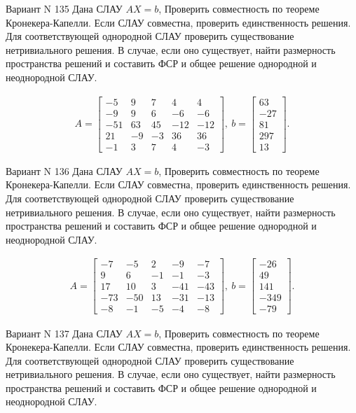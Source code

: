 \documentclass[11pt]{report}
\begin{document}
Вариант N 135
Дана СЛАУ $AX = b$,
Проверить совместность по теореме Кронекера-Капелли. Если СЛАУ совместна, проверить единственность решения.
Для соответствующей однородной СЛАУ проверить существование нетривиального решения. В случае, если оно существует,
найти размерность пространства решений и составить ФСР и общее решение однородной  и неоднородной СЛАУ.


\begin{align*}
 A = \left[\begin{matrix}-5 & 9 & 7 & 4 & 4\\-9 & 9 & 6 & -6 & -6\\-51 & 63 & 45 & -12 & -12\\21 & -9 & -3 & 36 & 36\\-1 & 3 & 7 & 4 & -3\end{matrix}\right],
\ b = \left[\begin{matrix}63\\-27\\81\\297\\13\end{matrix}\right]. 
 \end{align*}

Вариант N 136
Дана СЛАУ $AX = b$,
Проверить совместность по теореме Кронекера-Капелли. Если СЛАУ совместна, проверить единственность решения.
Для соответствующей однородной СЛАУ проверить существование нетривиального решения. В случае, если оно существует,
найти размерность пространства решений и составить ФСР и общее решение однородной  и неоднородной СЛАУ.


\begin{align*}
 A = \left[\begin{matrix}-7 & -5 & 2 & -9 & -7\\9 & 6 & -1 & -1 & -3\\17 & 10 & 3 & -41 & -43\\-73 & -50 & 13 & -31 & -13\\-8 & -1 & -5 & -4 & -8\end{matrix}\right],
\ b = \left[\begin{matrix}-26\\49\\141\\-349\\-79\end{matrix}\right]. 
 \end{align*}

Вариант N 137
Дана СЛАУ $AX = b$,
Проверить совместность по теореме Кронекера-Капелли. Если СЛАУ совместна, проверить единственность решения.
Для соответствующей однородной СЛАУ проверить существование нетривиального решения. В случае, если оно существует,
найти размерность пространства решений и составить ФСР и общее решение однородной  и неоднородной СЛАУ.
\end{document}
